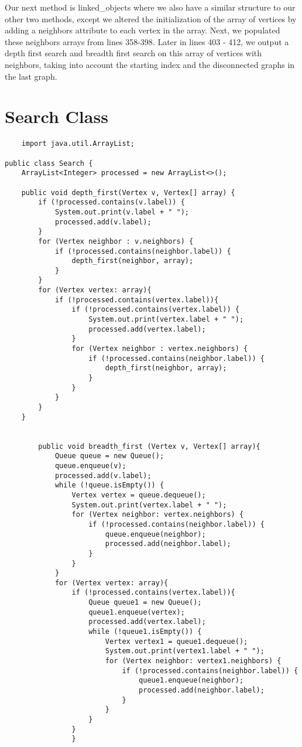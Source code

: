 \documentclass{article}
\begin{document}
    Our next method is linked\_objects where we also have a similar structure to our other two methods, except we altered the initialization of the array of vertices by adding a neighbors attribute to each vertex in the array.  Next, we populated these neighbors arrays from lines 358-398.  Later in lines 403 - 412, we output a depth first search and breadth first search on this array of vertices with neighbors, taking into account the starting index and the disconnected graphs in the last graph.
\newpage

\section{Search Class}
    \begin{lstlisting}
    import java.util.ArrayList;

public class Search {
    ArrayList<Integer> processed = new ArrayList<>();

    public void depth_first(Vertex v, Vertex[] array) {
        if (!processed.contains(v.label)) {
            System.out.print(v.label + " ");
            processed.add(v.label);
        }
        for (Vertex neighbor : v.neighbors) {
            if (!processed.contains(neighbor.label)) {
                depth_first(neighbor, array);
            }
        }
        for (Vertex vertex: array){
            if (!processed.contains(vertex.label)){
                if (!processed.contains(vertex.label)) {
                    System.out.print(vertex.label + " ");
                    processed.add(vertex.label);
                }
                for (Vertex neighbor : vertex.neighbors) {
                    if (!processed.contains(neighbor.label)) {
                        depth_first(neighbor, array);
                    }
                }
            }
        }
    }


        public void breadth_first (Vertex v, Vertex[] array){
            Queue queue = new Queue();
            queue.enqueue(v);
            processed.add(v.label);
            while (!queue.isEmpty()) {
                Vertex vertex = queue.dequeue();
                System.out.print(vertex.label + " ");
                for (Vertex neighbor: vertex.neighbors) {
                    if (!processed.contains(neighbor.label)) {
                        queue.enqueue(neighbor);
                        processed.add(neighbor.label);
                    }
                }
            }
            for (Vertex vertex: array){
                if (!processed.contains(vertex.label)){
                    Queue queue1 = new Queue();
                    queue1.enqueue(vertex);
                    processed.add(vertex.label);
                    while (!queue1.isEmpty()) {
                        Vertex vertex1 = queue1.dequeue();
                        System.out.print(vertex1.label + " ");
                        for (Vertex neighbor: vertex1.neighbors) {
                            if (!processed.contains(neighbor.label)) {
                                queue1.enqueue(neighbor);
                                processed.add(neighbor.label);
                            }
                        }
                    }
                }
                }


\end{lstlisting}
\end{document}
